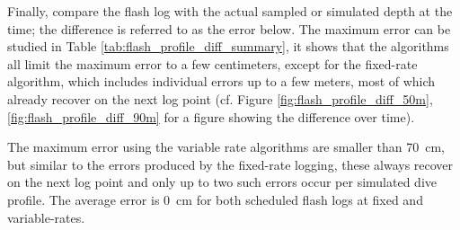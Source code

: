 Finally, compare the flash log with the actual sampled or simulated depth at the time; the difference is referred to as the error below.
The maximum error can be studied in Table \ref{tab:flash_profile_diff_summary}, it shows that the algorithms all limit the maximum error to a few centimeters, except for the fixed-rate algorithm, which includes individual errors up to a few meters, most of which already recover on the next log point (cf. Figure \ref{fig:flash_profile_diff_50m}, \ref{fig:flash_profile_diff_90m} for a figure showing the difference over time).

The maximum error using the variable rate algorithms are smaller than \SI{70}{\centi\meter}, but similar to the errors produced by the fixed-rate logging, these always recover on the next log point and only up to two such errors occur per simulated dive profile.
The average error is \SI{0}{\centi\meter} for both scheduled flash logs at fixed and variable-rates.

